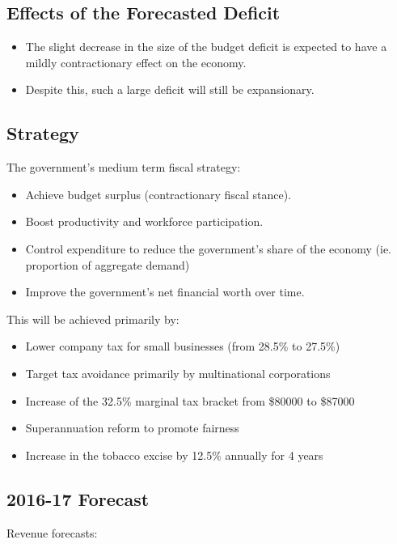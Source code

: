 \documentclass[a4paper,11pt]{article}
\begin{document}
\subsection{Effects of the Forecasted Deficit}

\begin{itemize}
\item The slight decrease in the size of the budget deficit is expected to have
	a mildly contractionary effect on the economy.
\item Despite this, such a large deficit will still be expansionary.
\end{itemize}


\subsection{Strategy}

The government's medium term fiscal strategy:

\begin{itemize}
\item Achieve budget surplus (contractionary fiscal stance).
\item Boost productivity and workforce participation.
\item Control expenditure to reduce the government's share of the economy (ie.
	proportion of aggregate demand)
\item Improve the government's net financial worth over time.
\end{itemize}

This will be achieved primarily by:

\begin{itemize}
\item Lower company tax for small businesses (from 28.5\% to 27.5\%)
\item Target tax avoidance primarily by multinational corporations
\item Increase of the 32.5\% marginal tax bracket from \$80000 to \$87000
\item Superannuation reform to promote fairness
\item Increase in the tobacco excise by 12.5\% annually for 4 years
\end{itemize}


\subsection{2016-17 Forecast}

Revenue forecasts:
\end{document}
